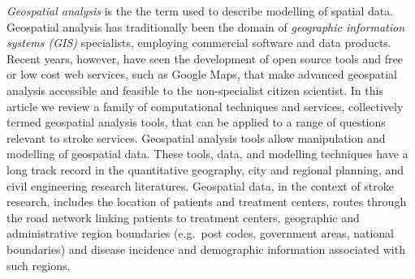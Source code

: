 \documentclass[utf8]{frontiersHLTH}
\begin{document}
{\em Geospatial analysis} is the the term used to describe modelling
of spatial data. Geospatial analysis has traditionally been the domain
of {\em geographic information systems (GIS)} specialists, employing
commercial software and data products. Recent years, however, have
seen the development of open source tools and free or low cost web
services, such as Google Maps, that make advanced geospatial analysis
accessible and feasible to the non-specialist citizen scientist. In
this article we review a family of computational techniques and
services, collectively termed geospatial analysis tools, that can be
applied to a range of questions relevant to stroke
services. Geospatial analysis tools allow manipulation and modelling
of geospatial data.  These tools, data, and modelling techniques have
a long track record in the quantitative geography, city and regional
planning, and civil engineering research literatures. Geospatial data,
in the context of stroke research, includes the location of patients
and treatment centers, routes through the road network linking
patients to treatment centers, geographic and administrative region
boundaries (e.g.~post codes, government areas, national boundaries)
and disease incidence and demographic information associated with such
regions.



\end{document}
